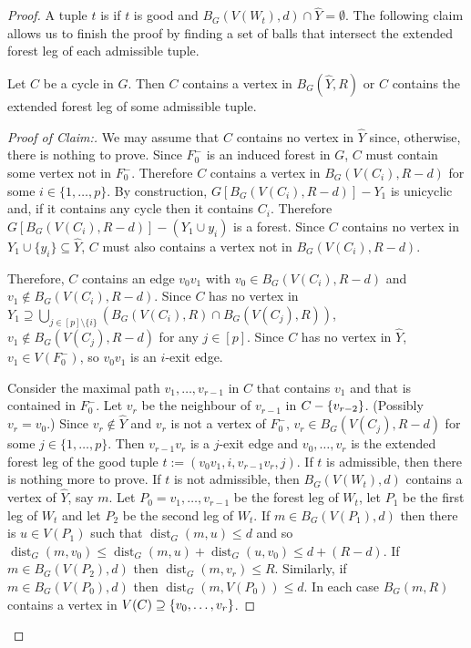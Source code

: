 \documentclass{patmorin}
\newcommand{\pat}[1]{\textcolor{Blue}{[Pat: #1]}}
\newcommand{\gwen}[1]{\textcolor{Purple}{Gwen: #1}}
\newenvironment{clmproof}{\begin{proof}[Proof of Claim:]\renewcommand{\qedsymbol}{\rule{1ex}{1ex}}}{\end{proof}}
\DeclareMathOperator{\dist}{dist}
\DeclarePairedDelimiter\set{\{}{\}}
\begin{document}
\begin{proof}
A tuple $t$ is  if $t$ is good and $B_G(V(W_t),d) \cap \widehat{Y} = \emptyset$.  The following claim 
allows us to finish the proof by finding a set of balls that intersect the extended forest leg of each admissible tuple.

\begin{clm}\label{hit_cycle}
  Let $C$ be a cycle in $G$.  Then  $C$ contains a vertex in $B_G(\widehat{Y},R)$ or $C$ contains the extended forest leg of some admissible tuple.
\end{clm}

\begin{clmproof}
  We may assume that $C$ contains no vertex in $\widehat{Y}$ since, otherwise, there is nothing to prove.
  Since $F_0^-$ is an induced forest in $G$, $C$ must contain some vertex not in $F_0^-$.  Therefore $C$ contains a vertex in $B_G(V(C_i),R-d)$  for some $i\in\{1,\ldots,p\}$. By construction, $G[B_G(V(C_i),R-d)]-Y_1$ is unicyclic and, if it contains any cycle then it contains $C_i$.  Therefore  $G[B_G(V(C_i),R-d)]-(Y_1\cup y_i)$ is a forest.  Since $C$ contains no vertex in $Y_1\cup\{y_i\}\subseteq \widehat{Y}$, $C$ must also contains a vertex not in $B_G(V(C_i),R-d)$.

  Therefore, $C$ contains an edge $v_0v_1$ with $v_0\in B_G(V(C_i),R-d)$ and $v_1\not\in B_G(V(C_i),R-d)$.  Since $C$ has no vertex in $Y_1\supseteq \bigcup_{j\in[p]\setminus\{i\}}(B_G(V(C_i),R)\cap B_G(V(C_j),R))$, $v_1\not\in B_G(V(C_j),R-d)$ for any $j\in[p]$. Since $C$ has no vertex in $\widehat{Y}$, $v_1\in V(F^-_0)$, so $v_0v_1$ is an $i$-exit edge.
  
  Consider the maximal path $v_1,\ldots,v_{r-1}$ in $C$ that contains $v_1$ and that is contained in $F_0^-$. Let $v_r$ be the neighbour of $v_{r-1}$ in $C-\set{v_{r-2}}$.  (Possibly $v_r=v_0$.)  Since $v_r\notin \widehat{Y}$ and $v_r$ is not a vertex of $F_0^-$, $v_r\in B_G(V(C_j),R-d)$ for some $j\in\{1,\ldots,p\}$.   Then $v_{r-1}v_r$ is a $j$-exit edge and $v_0,\ldots,v_{r}$ is the extended forest leg of the good tuple $t:=(v_0v_1,i,v_{r-1}v_r,j)$.   If $t$ is admissible, then there is nothing more to prove.  If $t$ is not admissible, 
  then $B_G(V(W_t),d)$ contains a vertex of $\widehat{Y}$, say $m$.  
  Let $P_0=v_1,\ldots,v_{r-1}$ be the forest leg of $W_t$, let $P_1$ be the first leg of $W_t$ and let $P_2$ be the second leg of $W_t$. 
  If $m\in B_G(V(P_1),d)$ then there is $u\in V(P_1)$ such that $\dist_G(m,u)\leq d$ and so 
  $\dist_G(m,v_0)\le \dist_G(m,u) + \dist_G(u,v_0)\le d + (R-d)$.  
  If $m\in B_G(V(P_2),d)$ then $\dist_G(m,v_r)\le R$.  Similarly, if $m\in B_G(V(P_0),d)$ then $\dist_G(m,V(P_0))\le d$.  In each case $B_G(m,R)$ contains a vertex in $V(C)\supseteq \set{v_0,\ldots,v_r}$.
\end{clmproof}


\end{proof}
\end{document}
